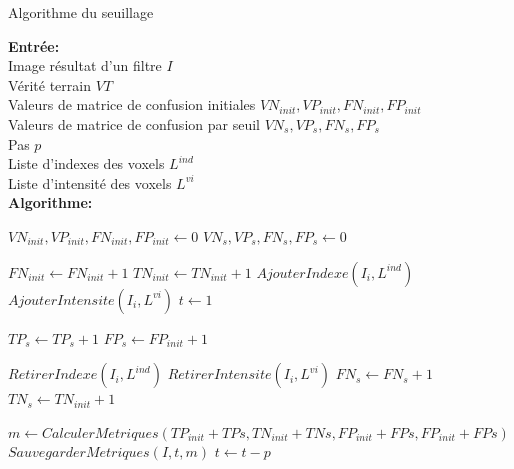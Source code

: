\begin{algorithm}[h]
  \caption{
  Algorithme du seuillage}\label{alg:BenchmarkThreshold}
    \textbf{Entrée:}\\
      Image résultat d'un filtre $I$\\
      Vérité terrain $VT$\\
      Valeurs de matrice de confusion initiales $VN_{init},VP_{init},FN_{init},FP_{init}$\\
      Valeurs de matrice de confusion par seuil $VN_{s},VP_{s},FN_{s},FP_{s}$\\
      Pas $p$ \\
      Liste d'indexes des voxels $L^{ind}$ \\
      Liste d'intensité des voxels $L^{vi}$ \\
      \textbf{Algorithme:}
      \begin{algorithmic}
          \State $VN_{init},VP_{init},FN_{init},FP_{init} \gets 0 $
          \State $VN_{s},VP_{s},FN_{s},FP_{s} \gets 0$

                  \State $FN_{init} \gets FN_{init} + 1$
                \Else
                  \State $TN_{init} \gets TN_{init} + 1$
                \EndIf
              \Else
                \State $ AjouterIndexe(I_{i},L^{ind})  $
                \State $ AjouterIntensite(I_{i},L^{vi})$
              \EndIf
          \EndFor
          \State $t \gets 1$

                  \State $TP_{s} \gets TP_{s} + 1$
                  \Else
                  \State $FP_{s} \gets FP_{init} + 1$
                \EndIf
                
                \State $RetirerIndexe(I_{i},L^{ind})$
                \State $RetirerIntensite(I_{i},L^{vi})$
              \Else
                  \State $FN_{s} \gets FN_{s} + 1$
                \Else
                  \State $TN_{s} \gets TN_{init} + 1$
                \EndIf
              \EndIf
            \EndWhile

            \State  $ m \gets CalculerMetriques(TP_{init}+TP{s},TN_{init}+TN{s},FP_{init}+FP{s},FP_{init}+FP{s})$
            \State  $ SauvegarderMetriques(I,t,m)$
            \State $ t \gets t - p$ 
               
          \EndWhile
      \end{algorithmic}

  \end{algorithm}

